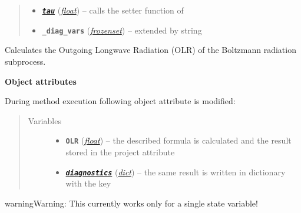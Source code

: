 \documentclass[letterpaper,10pt,english]{sphinxmanual}
\begin{document}
\begin{fulllineitems}
\begin{quote}
\begin{description}
\begin{itemize}
\item {} 
{\hyperref[api/climlab.radiation:climlab.radiation.Boltzmann.Boltzmann.tau]{\emph{\textbf{\texttt{tau}}}}} (\href{http://docs.python.org/2.7/library/functions.html\#float}{\emph{float}}) -- calls the setter function of {\hyperref[api/climlab.radiation:climlab.radiation.Boltzmann.Boltzmann.tau]{\emph{}}}

\item {} 
\textbf{\texttt{\_diag\_vars}} (\href{http://docs.python.org/2.7/library/stdtypes.html\#frozenset}{\emph{frozenset}}) -- extended by string 

\end{itemize}

\end{description}\end{quote}

\begin{fulllineitems}
\label{api/climlab.radiation:climlab.radiation.Boltzmann.Boltzmann.emission}
Calculates the Outgoing Longwave Radiation (OLR) of the Boltzmann 
radiation subprocess.

\textbf{Object attributes}

During method execution following object attribute is modified:
\begin{quote}\begin{description}
\item[{Variables}] \leavevmode\begin{itemize}
\item {} 
\textbf{\texttt{OLR}} (\href{http://docs.python.org/2.7/library/functions.html\#float}{\emph{float}}) -- the described formula is calculated and the
result stored in the project attribute 

\item {} 
{\hyperref[api/climlab.process:climlab.process.process.Process.diagnostics]{\emph{\textbf{\texttt{diagnostics}}}}} (\href{http://docs.python.org/2.7/library/stdtypes.html\#dict}{\emph{dict}}) -- the same result is written in  
dictionary with the key 

\end{itemize}

\end{description}\end{quote}

\begin{notice}{warning}{Warning:}
This currently works only for a single state variable!
\end{notice}


\end{fulllineitems}
\end{fulllineitems}
\end{document}
